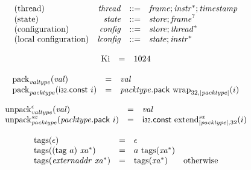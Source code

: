 \vspace{1ex}

$$
\begin{array}[t]{@{}lrrl@{}l@{}}
\mbox{(thread)} & {\mathit{thread}} & ::= & {\mathit{frame}} ; {{\mathit{instr}}^\ast} ; {\mathit{timestamp}} \\
\mbox{(state)} & {\mathit{state}} & ::= & {\mathit{store}} ; {{\mathit{frame}}^?} \\
\mbox{(configuration)} & {\mathit{config}} & ::= & {\mathit{store}} ; {{\mathit{thread}}^\ast} \\
\mbox{(local configuration)} & {\mathit{lconfig}} & ::= & {\mathit{state}} ; {{\mathit{instr}}^\ast} \\
\end{array}
$$

\vspace{1ex}

\vspace{1ex}

$$
\begin{array}[t]{@{}lcl@{}l@{}}
{\mathrm{Ki}} & = & 1024 \\
\end{array}
$$

\vspace{1ex}

$$
\begin{array}[t]{@{}lcl@{}l@{}}
{{\mathrm{pack}}}_{{\mathit{valtype}}}({\mathit{val}}) & = & {\mathit{val}} \\
{{\mathrm{pack}}}_{{\mathit{packtype}}}(\mathsf{i{\scriptstyle 32}}{.}\mathsf{const}~i) & = & {\mathit{packtype}}{.}\mathsf{pack}~{{\mathrm{wrap}}}_{32, {|{\mathit{packtype}}|}}(i) \\
\end{array}
$$

$$
\begin{array}[t]{@{}lcl@{}l@{}}
{{{{\mathrm{unpack}}}_{{\mathit{valtype}}}^{\epsilon}}}{({\mathit{val}})} & = & {\mathit{val}} \\
{{{{\mathrm{unpack}}}_{{\mathit{packtype}}}^{{\mathit{sx}}}}}{({\mathit{packtype}}{.}\mathsf{pack}~i)} & = & \mathsf{i{\scriptstyle 32}}{.}\mathsf{const}~{{{{\mathrm{extend}}}_{{|{\mathit{packtype}}|}, 32}^{{\mathit{sx}}}}}{(i)} \\
\end{array}
$$

\vspace{1ex}

$$
\begin{array}[t]{@{}lcl@{}l@{}}
{\mathrm{tags}}(\epsilon) & = & \epsilon \\
{\mathrm{tags}}((\mathsf{tag}~a)~{{\mathit{xa}}^\ast}) & = & a~{\mathrm{tags}}({{\mathit{xa}}^\ast}) \\
{\mathrm{tags}}({\mathit{externaddr}}~{{\mathit{xa}}^\ast}) & = & {\mathrm{tags}}({{\mathit{xa}}^\ast}) & \quad \mbox{otherwise} \\
\end{array}
$$


